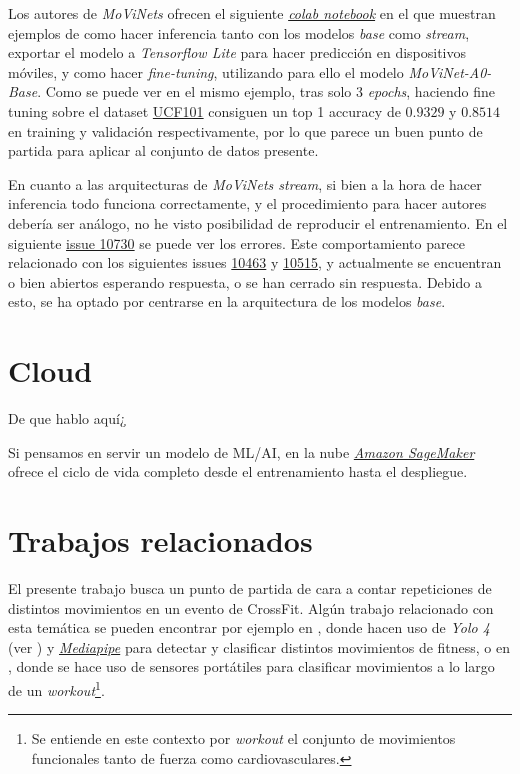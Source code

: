 Los autores de \textit{MoViNets} ofrecen el siguiente \href{https://colab.research.google.com/github/tensorflow/models/blob/master/official/projects/movinet/movinet_tutorial.ipynb}{\textit{colab notebook}} en el que muestran ejemplos de como hacer inferencia tanto con los modelos \textit{base} como \textit{stream}, exportar el modelo a \textit{Tensorflow Lite} para hacer predicción en dispositivos móviles, y como hacer \textit{fine-tuning}, utilizando para ello el modelo \textit{MoViNet-A0-Base}. Como se puede ver en el mismo ejemplo, tras solo 3 \textit{epochs}, haciendo fine tuning sobre el dataset \href{https://www.tensorflow.org/datasets/catalog/ucf101}{UCF101} consiguen un top 1 accuracy de $0.9329$ y $0.8514$ en training y validación respectivamente, por lo que parece un buen punto de partida para aplicar al conjunto de datos presente.

En cuanto a las arquitecturas de \textit{MoViNets stream}, si bien a la hora de hacer inferencia todo funciona correctamente, y el procedimiento para hacer autores debería ser análogo, no he visto posibilidad de reproducir el entrenamiento. En el siguiente \href{https://github.com/tensorflow/models/issues/10730}{issue 10730} se puede ver los errores. Este comportamiento parece relacionado con los siguientes issues \href{https://github.com/tensorflow/models/issues/10463#issuecomment-1019395406_}{10463} y \href{https://github.com/tensorflow/models/issues/10515}{10515}, y actualmente se encuentran o bien abiertos esperando respuesta, o se han cerrado sin respuesta. Debido a esto, se ha optado por centrarse en la arquitectura de los modelos \textit{base}.


\section{Cloud}

De que hablo aquí¿

Si pensamos en servir un modelo de ML/AI, en la nube \href{https://aws.amazon.com/sagemaker/?nc1=h_ls}{\textit{Amazon SageMaker}} ofrece el ciclo de vida completo desde el entrenamiento hasta el despliegue.


\section{Trabajos relacionados}

El presente trabajo busca un punto de partida de cara a contar repeticiones de distintos movimientos en un evento de CrossFit. Algún trabajo relacionado con esta temática se pueden encontrar por ejemplo en 
\cite{FitnessMovementTypes}, donde hacen uso de \textit{Yolo 4} (ver 
\cite{Yolo4}) y \href{https://mediapipe.dev/}{\textit{Mediapipe}} para detectar y clasificar distintos movimientos de fitness, o en \cite{ClassifyFunctionalFitness}, donde se hace uso de sensores portátiles para clasificar movimientos a lo largo de un \textit{workout}\footnote{Se entiende en este contexto por \textit{workout} el conjunto de movimientos funcionales tanto de fuerza como cardiovasculares.}. 

